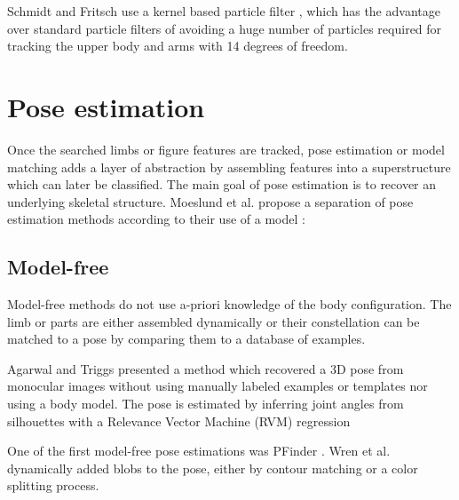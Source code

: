 Schmidt and Fritsch use a kernel based particle filter \cite{Schmidt}, which has the advantage over standard particle filters of avoiding a huge number of particles required for tracking the upper body and arms with 14 degrees of freedom.

\section{Pose estimation}
\label{sec:pose-estimation}

Once the searched limbs or figure features are tracked, pose estimation or model matching adds a layer of abstraction by assembling features into a superstructure which can later be classified. The main goal of pose estimation is to recover an underlying skeletal structure. Moeslund et al. propose a separation of pose estimation methods according to their use of a model \cite{Moeslund}:

\subsection{Model-free}
\label{sub:model-free}

Model-free methods do not use a-priori knowledge of the body configuration. The limb or parts are either assembled dynamically or their constellation can be matched to a pose by comparing them to a database of examples.

Agarwal and Triggs presented a method which recovered a 3D pose from monocular images without using manually labeled examples or templates nor using a body model. The pose is estimated by inferring joint angles from silhouettes with a Relevance Vector Machine (RVM) regression \cite{Agarwal}

One of the first model-free pose estimations was PFinder \cite{Wren}. Wren et al. dynamically added blobs to the pose, either by contour matching or a color splitting process. 

